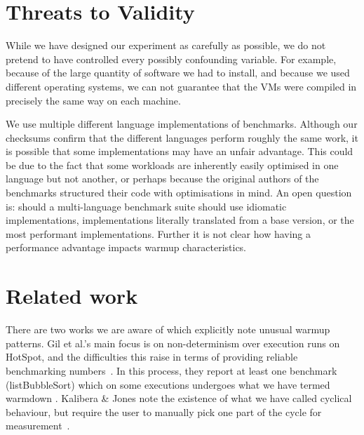 \documentclass[10pt,preprint]{sigplanconf}
\newcommand{\kalibera}{Kalibera \& Jones\xspace}
\begin{document}
\section{Threats to Validity}
\label{sec:threats}

While we have designed our experiment as carefully as possible, we do not
pretend to have controlled every possibly confounding variable. For example,
because of the large quantity of software we had to install, and because we used
different operating systems, we can not guarantee that the VMs were compiled in
precisely the same way on each machine. 

We use multiple different language implementations of benchmarks. Although our
checksums confirm that the different languages perform roughly the same work,
it is possible that some implementations may have an unfair advantage. This
could be due to the fact that some workloads are inherently easily optimised in
one language but not another, or perhaps because the original authors of the
benchmarks structured their code with optimisations in mind. An open question
is: should a multi-language benchmark suite should use idiomatic
implementations, implementations literally translated from a base version, or
the most performant implementations. Further it is not clear how having a
performance advantage impacts warmup characteristics.




\section{Related work}

There are two works we are aware of which explicitly note unusual warmup
patterns. Gil et al.'s main focus is on non-determinism over execution runs on
HotSpot, and the difficulties this raise in terms of providing reliable
benchmarking numbers~\cite{gil11microbenchmark}. In this process, they report at
least one benchmark (listBubbleSort) which on some executions undergoes what we
have termed warmdown . \kalibera note the
existence of what we have called cyclical behaviour, but require the user to
manually pick one part of the cycle for measurement~\cite{kalibera13rigorous}.
\end{document}
